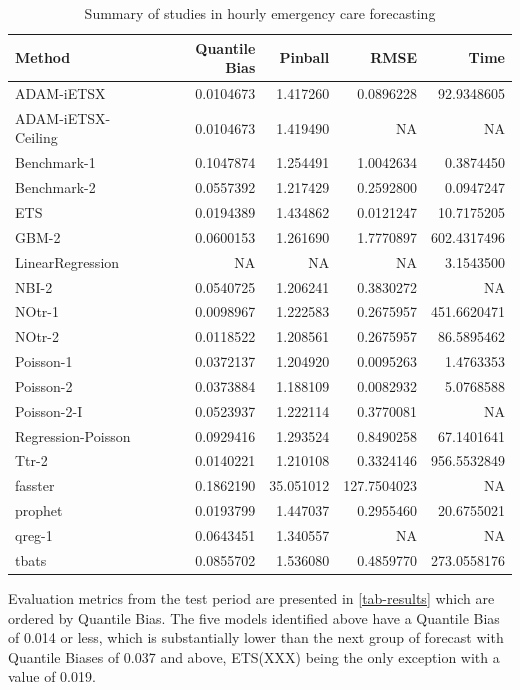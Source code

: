 \documentclass[]{elsarticle} %
\begin{document}
\begin{table}[!h]

\caption{\label{tab:tab-results}Summary of studies in hourly emergency care forecasting}
\centering
\fontsize{11}{13}\selectfont
\begin{tabular}[t]{lrrrr}
\toprule
Method & Quantile Bias & Pinball & RMSE & Time\\
\midrule
ADAM-iETSX & 0.0104673 & 1.417260 & 0.0896228 & 92.9348605\\
ADAM-iETSX-Ceiling & 0.0104673 & 1.419490 & NA & NA\\
Benchmark-1 & 0.1047874 & 1.254491 & 1.0042634 & 0.3874450\\
Benchmark-2 & 0.0557392 & 1.217429 & 0.2592800 & 0.0947247\\
ETS & 0.0194389 & 1.434862 & 0.0121247 & 10.7175205\\
GBM-2 & 0.0600153 & 1.261690 & 1.7770897 & 602.4317496\\
LinearRegression & NA & NA & NA & 3.1543500\\
NBI-2 & 0.0540725 & 1.206241 & 0.3830272 & NA\\
NOtr-1 & 0.0098967 & 1.222583 & 0.2675957 & 451.6620471\\
NOtr-2 & 0.0118522 & 1.208561 & 0.2675957 & 86.5895462\\
Poisson-1 & 0.0372137 & 1.204920 & 0.0095263 & 1.4763353\\
Poisson-2 & 0.0373884 & 1.188109 & 0.0082932 & 5.0768588\\
Poisson-2-I & 0.0523937 & 1.222114 & 0.3770081 & NA\\
Regression-Poisson & 0.0929416 & 1.293524 & 0.8490258 & 67.1401641\\
Ttr-2 & 0.0140221 & 1.210108 & 0.3324146 & 956.5532849\\
fasster & 0.1862190 & 35.051012 & 127.7504023 & NA\\
prophet & 0.0193799 & 1.447037 & 0.2955460 & 20.6755021\\
qreg-1 & 0.0643451 & 1.340557 & NA & NA\\
tbats & 0.0855702 & 1.536080 & 0.4859770 & 273.0558176\\
\bottomrule
\end{tabular}
\end{table}

Evaluation metrics from the test period are presented in \ref{tab-results} which are ordered by Quantile Bias. The five models identified above have a Quantile Bias of 0.014 or less, which is substantially lower than the next group of forecast with Quantile Biases of 0.037 and above, ETS(XXX) being the only exception with a value of 0.019.
\end{document}
